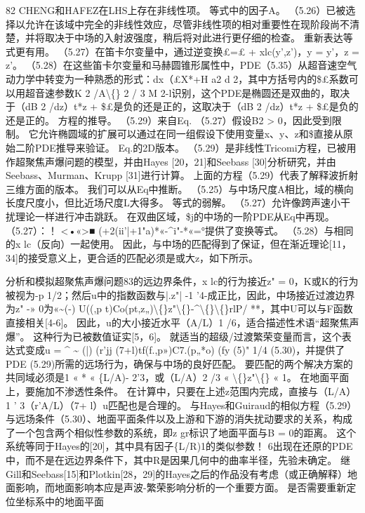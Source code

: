 \documentclass[UTF8,11pt,a4paper,openany,fontset=fandol]{ctexbook}
\begin{document}
82 CHENG和HAFEZ在LHS上存在非线性项。 等式中的因子A。 （5.26）已被选择以允许在该域中完全的非线性效应，尽管非线性项的相对重要性在现阶段尚不清楚，并将取决于中场的入射波强度，稍后将对此进行更仔细的检查。 重新表达等式更有用。 （5.27）在笛卡尔变量中，通过逆变换£=£ + xlc(y',z')，y = y'，z = z'。 （5.28）在这些笛卡尔变量和马赫圆锥形属性中，PDE（5.35）从超音速空气动力学中转变为一种熟悉的形式：dx（£X*+H a2 d 2，其中方括号内的\$£系数可以用超音速参数K 2 /A\textbackslash\{\} 2 / 3 M 2-l识别，这个PDE是椭圆还是双曲的，取决于（dB 2 /dz）t*z + \$£是负的还是正的，这取决于（dB 2 /dz）t*z + \$£是负的还是正的。 方程的推导。 （5.29）来自Eq. （5.27）假设B2 > 0，因此受到限制。 它允许椭圆域的扩展可以通过在同一组假设下使用变量x、y、z和\$直接从原始二阶PDE推导来验证。 Eq.的2D版本。 （5.29）是非线性Tricomi方程，已被用作超聚焦声爆问题的模型，并由Hayes [20，21]和Seebass [30]分析研究，并由Seebass、Murman、Krupp [31]进行计算。 上面的方程（5.29）代表了解释波折射三维方面的版本。 我们可以从Eq中推断。 （5.25）与中场尺度A相比，域的横向长度尺度小，但比近场尺度L大得多。 等式的弱解。 （5.27）允许像跨声速小干扰理论一样进行冲击跳跃。 在双曲区域，\$j的中场的一阶PDE从Eq中再现。 （5.27）：！ <•«>■ (+2(ii'|+1"a)*«-\textasciicircum{}i"-*«=°提供了变换等式。 （5.28）与相同的x lc（反向）一起使用。 因此，与中场的匹配得到了保证，但在渐近理论[11，34]的接受意义上，更合适的匹配必须是或大z，如下所示。

分析和模拟超聚焦声爆问题83的远边界条件，x lc的行为接近z" = 0，K或K的行为被视为-p 1/2；然后u中的指数函数与|.z"| -1 '4-成正比，因此，中场接近过渡边界为z" -» 0为«\textasciitilde{}(-) U((,p t)Co(pt,z„)\textbackslash\{\}z"\textbackslash\{\}-\textasciicircum{}\textbackslash\{\}\textbackslash\{\}rlP/ **，其中U可以与F函数直接相关[4-6]。 因此，u的大小接近水平（A/L）1 /6，适合描述性术语“超聚焦声爆”。 这种行为已被数值证实[5，6]。 就适当的超级/过渡繁荣变量而言，这个表达式变成u = \textasciicircum{} \textasciitilde{} (|) (r'jj (7+l)tf(f.,p»)C7.(p„*o) (fy (5)" 1/4 (5.30)，并提供了PDE (5.29)所需的远场行为，确保与中场的良好匹配。 要匹配的两个解决方案的共同域必须是1 « * « \{L/A)- 2'3，或（L/A）2 /3 « \textbackslash\{\}z"\textbackslash\{\} « 1。 在地面平面上，要施加不渗透性条件。 在计算中，只要在上述z范围内完成，直接与（L/A）1 ' 3（r'A/L）（7+ l）u匹配也是合理的。 与Hayes和Guiraud的相似方程（5.29）与远场条件（5.30）、地面平面条件以及上游和下游的消失扰动要求的关系，构成了一个包含两个相似性参数的系统，即z gr标识了地面平面与B = 0的距离。 这个系统等同于Hayes的[20]，其中具有因子\{L/R)1的类似参数！ 6出现在还原的PDE中，而不是在远边界条件下，其中R是因果几何中的曲率半径，先验未确定。 继Gill和Seebass[15]和Plotkin[28，29]的Hayes之后的作品没有考虑（或正确解释）地面影响，而地面影响本应是声波-繁荣影响分析的一个重要方面。 是否需要重新定位坐标系中的地面平面
\end{document}
